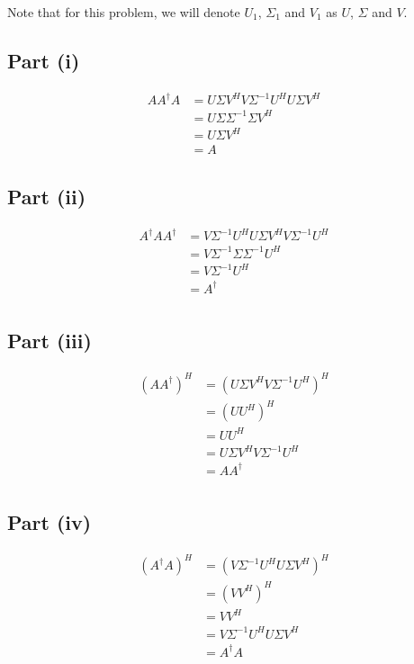 \documentclass{article}
\begin{document}
Note that for this problem, we will denote $U_1$, $\Sigma_1$ and $V_1$ as $U$, $\Sigma$ and $V$.

\subsection*{Part (i)}

\begin{align*}
AA^{\dagger}A &= U\Sigma V^{H}V\Sigma^{-1} U^{H}U\Sigma V^{H} \\
&= U\Sigma\Sigma^{-1}\Sigma V^{H} \\
&= U\Sigma V^{H} \\
&= A
\end{align*}

\subsection*{Part (ii)}

\begin{align*}
A^{\dagger}AA^{\dagger} &= V\Sigma^{-1} U^{H}U\Sigma V^{H}V\Sigma^{-1} U^{H} \\
&= V\Sigma^{-1} \Sigma \Sigma^{-1} U^{H} \\
&= V\Sigma^{-1} U^{H} \\
&= A^{\dagger} \\
\end{align*}

\subsection*{Part (iii)}

\begin{align*}
(AA^{\dagger})^{H} &= (U\Sigma V^{H}V\Sigma^{-1} U^{H})^{H} \\
&= (UU^{H})^{H} \\
&= UU^{H} \\
&= U\Sigma V^{H}V\Sigma^{-1} U^{H} \\
&= AA^{\dagger} \\
\end{align*}

\subsection*{Part (iv)}

\begin{align*}
(A^{\dagger}A)^{H} &= (V\Sigma^{-1} U^{H}U\Sigma V^{H})^{H} \\
&= (VV^{H})^{H} \\
&= VV^{H} \\
&= V\Sigma^{-1} U^{H}U\Sigma V^{H} \\
&= A^{\dagger}A \\
\end{align*}
\end{document}
